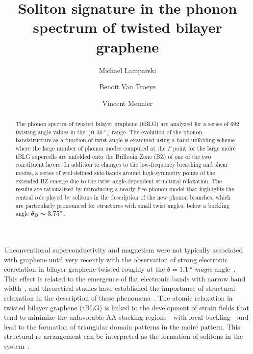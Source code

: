 \documentclass[prl,preprint]{revtex4}
\begin{document}
\title{Soliton signature in the phonon spectrum of twisted bilayer graphene}
\author{Michael Lamparski}
\author{Benoit Van Troeye}
\author{Vincent Meunier}

\begin{abstract}
The phonon spectra of twisted bilayer graphene (tBLG) are analyzed for a series of 692 twisting angle values in the $[0,\SI{30}{\degree}]$ range. The evolution of the phonon bandstructure as a function of twist angle is examined using a band unfolding scheme where the large number of phonon modes computed at the $\Gamma$ point for the large moir\'e tBLG supercells are unfolded onto the Brillouin Zone (BZ) of one of the two constituent layers. In addition to changes to the low-frequency breathing and shear modes, a series of well-defined side-bands around high-symmetry points of the extended BZ emerge due to the twist angle-dependent structural relaxation. The results are rationalized by introducing a nearly-free-phonon model that highlights the central role played by solitons in the description of the new phonon branches, which are particularly pronounced for structures with small twist angles, below a buckling angle $\theta_{\rm B}\sim\SI{3.75}{\degree}$.
\end{abstract}

\maketitle
Unconventional superconductivity and magnetism were not typically associated with graphene until very recently with the observation of strong electronic correlation in bilayer graphene twisted roughly at the $\theta=\SI{1.1}{\degree}$ \textit{magic} angle~\cite{Cao2018,Cao2018b,Yankowitz2019,Sharpe2019,Codecidoeaaw2019}.  This effect is related to the emergence of flat electronic bands with narrow band width~\cite{Cao2018,Codecidoeaaw2019,Nam2017,Uchida2014,Guinea2019}, and theoretical studies have established the importance of structural relaxation in the description of these phenomena~\cite{Alden2013,Nam2017,Wijk2015,Dai2016,Jain2016,Choi2018,Koshino2019b,Yong2019}. The atomic relaxation in twisted bilayer graphene (tBLG) is linked to the development of strain fields that tend to minimize the unfavorable AA-stacking regions---with local buckling---and lead to the formation of triangular domain patterns in the moir\'e pattern. This structural re-arrangement can be interpreted as the formation of solitons in the system~\cite{Frank1949,Popov2011, Alden2013}.
\end{document}
